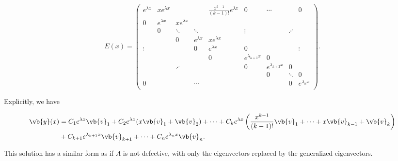 \documentclass[english,a4paper,12pt]{report}
\begin{document}
\begin{equation}
    E(x) = \begin{pmatrix}
        e^{\lambda x}  & x e^{\lambda x}  &  &  & \frac{x^{k-1} }{(k-1)!}e^{\lambda x }  & 0 & \cdots  &  &  0  \\
        0 & e^{\lambda x}  & xe^{\lambda x }  &  &  &  &  &  &   \\
         & 0 & \ddots & \ddots  &  & \vdots  &  & \iddots &   \\
         &  & 0 &  e^{\lambda x }  & xe^{\lambda x } &  &  &  &  \\
        \vdots  &  &  & 0 & e^{\lambda x } & 0 &  &  &  \vdots  \\
         &  &  &  & 0 & e^{\lambda _{k+1}x }  & 0 &  &   \\
         &  & \iddots &  &  & 0 & e^{\lambda _{k+2} x}  & 0 &   \\
         &  &  &  &  &  & 0 & \ddots  & 0  \\
        0 &  &  & \cdots  &  &  &  & 0 & e^{\lambda _{n}x }   \\
    \end{pmatrix}.
\end{equation}

Explicitly, we have

\begin{equation}
    \begin{aligned} 
    \vb{y} (x) &= C_1 e^{\lambda x}\vb{v} _{1} + C_2 e^{\lambda x}(x \vb{v} _{1}+\vb{v} _{2}  ) + \cdots + C_{k}e^{\lambda x}\left( \frac{x^{k-1} }{(k-1)!} \vb{v} _{1} + \cdots +x\vb{v} _{k-1}+\vb{v} _{k}    \right) \\
    &+ C_{k+1}e^{\lambda _{k+1}x }\vb{v} _{k+1} + \cdots + C_{n}e^{\lambda _{n}x }\vb{v} _{n}.    
    \end{aligned}        
\end{equation}

This solution has a similar form as if \(A\) is not defective, with only the eigenvectors replaced by the generalized eigenvectors.
\end{document}
